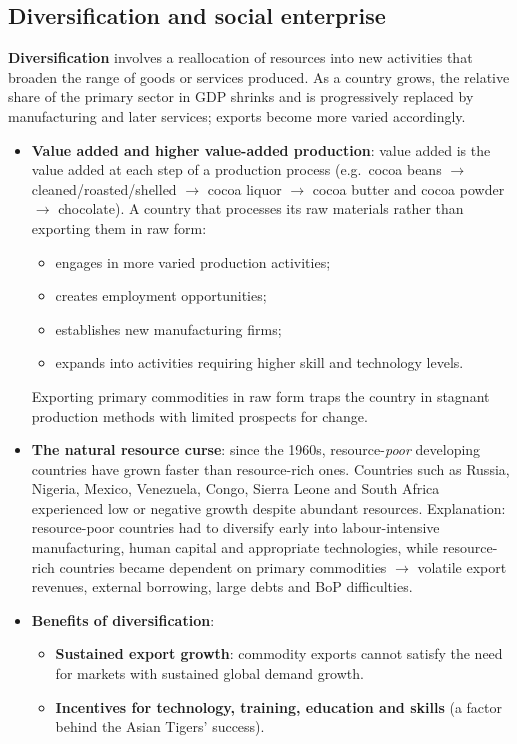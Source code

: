 \documentclass[a4paper,12pt]{article}
\newcommand{\needbold}[1]{\textcolor{red!70!black}{\textbf{#1}}}
\begin{document}
\subsection{Diversification and social enterprise}
\needbold{Diversification} involves a reallocation of resources into new activities that broaden the range of goods or services produced. As a country grows, the relative share of the primary sector in GDP shrinks and is progressively replaced by manufacturing and later services; exports become more varied accordingly.
\begin{itemize}
  \item \textbf{Value added and higher value-added production}: value added is the value added at each step of a production process (e.g.\ cocoa beans $\to$ cleaned/roasted/shelled $\to$ cocoa liquor $\to$ cocoa butter and cocoa powder $\to$ chocolate). A country that processes its raw materials rather than exporting them in raw form:
  \begin{itemize}
    \item engages in more varied production activities;
    \item creates employment opportunities;
    \item establishes new manufacturing firms;
    \item expands into activities requiring higher skill and technology levels.
  \end{itemize}
  Exporting primary commodities in raw form traps the country in stagnant production methods with limited prospects for change.
  \item \textbf{The natural resource curse}: since the 1960s, resource-\textit{poor} developing countries have grown faster than resource-rich ones. Countries such as Russia, Nigeria, Mexico, Venezuela, Congo, Sierra Leone and South Africa experienced low or negative growth despite abundant resources. Explanation: resource-poor countries had to diversify early into labour-intensive manufacturing, human capital and appropriate technologies, while resource-rich countries became dependent on primary commodities $\to$ volatile export revenues, external borrowing, large debts and BoP difficulties.
  \item \textbf{Benefits of diversification}:
  \begin{itemize}
    \item \textbf{Sustained export growth}: commodity exports cannot satisfy the need for markets with sustained global demand growth.
    \item \textbf{Incentives for technology, training, education and skills} (a factor behind the Asian Tigers' success).

\end{itemize}
\end{itemize}
\end{document}

